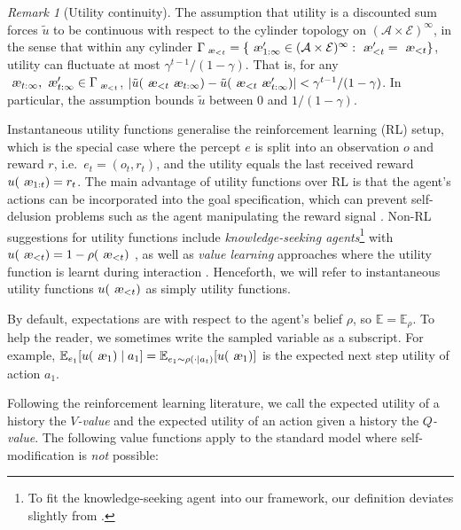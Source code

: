 \documentclass[a4paper]{article}
\theoremstyle{definition}
\theoremstyle{remark}
\newtheorem{remark}[theorem]{Remark}
\def\EE{{\mathbb{E}}}  %
\def\A{\mathcal{A}}      %
\def\E{\mathcal{E}}      %
\let\aechar\ae %
\renewcommand{\ae}{
\ifmmode\mathchoice{
	\mbox{\textsl{\aechar}}
}{
	\mbox{\textsl{\aechar}}
}{
	\mbox{\scriptsize\textsl{\aechar}}
}{
	\mbox{\scriptsize\textsl{\aechar}}
}\else\aechar\fi%
}                         %
\begin{document}
\begin{remark}[Utility continuity]
The assumption that utility is a discounted sum forces $\tilde u$
to be continuous with respect to the cylinder topology on $(\A\times\E)^\infty$,
in the sense that within any cylinder
$\Gamma_{\ae_{<t}}=\{\ae_{1:\infty}'\in(\A\times\E)^\infty:\ae_{<t}'=\ae_{<t}\}$,
utility can fluctuate at most $\gamma^{t-1}/(1-\gamma)$.
That is, for any $\ae_{t:\infty},\ae_{t:\infty}'\in\Gamma_{\ae_{<t}}$,
$|\tilde u(\ae_{<t}\ae_{t:\infty})-\tilde u(\ae_{<t}\ae_{t:\infty}')|
<\gamma^{t-1}/(1-\gamma)$.
In particular, the assumption bounds $\tilde u$ between 0 and $1/(1-\gamma)$.
\end{remark}

Instantaneous utility functions generalise the reinforcement learning (RL) setup,
which is the special case where the percept $e$ is split into an
observation $o$ and reward $r$, i.e.\ $e_t=(o_t,r_t)$,
and the utility equals the last received reward $u(\ae_{1:t})=r_t$.
The main advantage of utility functions over RL is that
the agent's actions can be incorporated into the goal specification,
which can prevent self-delusion problems such as the agent manipulating
the reward signal \citep{Everitt2016vrl,Hibbard2012,Ring2011}.
Non-RL suggestions for utility functions include
\emph{knowledge-seeking agents}\footnote{To fit the knowledge-seeking
agent into our framework, our definition deviates slightly from \citet{Orseau2014}.}
with $u(\ae_{<t})=1-\rho(\ae_{<t})$ \citep{Orseau2014},
as well as \emph{value learning} approaches where the utility function
is learnt during interaction \citep{Dewey2011}.
Henceforth, we will refer to instantaneous utility functions $u(\ae_{<t})$
as simply utility functions.

By default, expectations are with respect to the agent's belief
$\rho$, so $\EE=\EE_\rho$.
To help the reader, we sometimes write the sampled variable as a subscript.
For example, $\EE_{e_1}[u(\ae_1)\mid a_1]=\EE_{e_1\sim\rho(\cdot\mid a_t)}[u(\ae_1)]$
is the expected next step utility of action $a_1$.

Following the reinforcement learning literature, we call
the expected utility of a history the \emph{$V$-value} and
the expected utility of an action given a history the \emph{$Q$-value}.
The following value functions apply to the standard model
where self-modification is \emph{not} possible:
\end{document}
